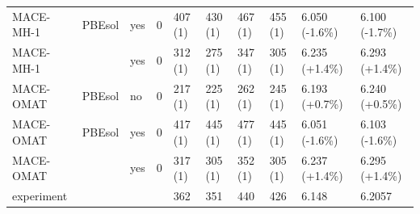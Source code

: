 \begin{table}[htbp]
{\begin{tabular}{llllllllll}
MACE-MH-1 & PBEsol & yes & 0 & 407 (1) & 430 (1) & 467 (1) & 455 (1) & 6.050 (-1.6\%) & 6.100 (-1.7\%) \\
MACE-MH-1 & \rSCAN{} & yes & 0 & 312 (1) & 275 (1) & 347 (1) & 305 (1) & 6.235 (+1.4\%) & 6.293 (+1.4\%) \\
MACE-OMAT & PBEsol & no & 0 & 217 (1) & 225 (1) & 262 (1) & 245 (1) & 6.193 (+0.7\%) & 6.240 (+0.5\%) \\
MACE-OMAT & PBEsol & yes & 0 & 417 (1) & 445 (1) & 477 (1) & 445 (1) & 6.051 (-1.6\%) & 6.103 (-1.6\%) \\
MACE-OMAT & \rSCAN{} & yes & 0 & 317 (1) & 305 (1) & 352 (1) & 305 (1) & 6.237 (+1.4\%) & 6.295 (+1.4\%) \\
experiment &  &  &  & 362 & 351 & 440 & 426 & 6.148 & 6.2057 \\
\bottomrule
\end{tabular}}
\end{table}

